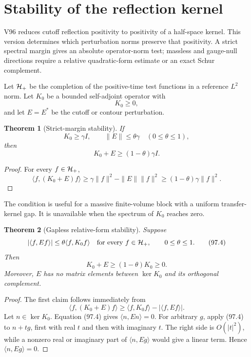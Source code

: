 \documentclass[11pt]{article}
\newtheorem{theorem}{Theorem}[section]
\begin{document}
\section{Stability of the reflection kernel}
\label{sec:v11v97}

V96 reduces cutoff reflection positivity to positivity of a
half-space kernel.  This version determines which perturbation norms
preserve that positivity.  A strict spectral margin gives an absolute
operator-norm test; massless and gauge-null directions require a
relative quadratic-form estimate or an exact Schur complement.

Let \({\cal H}_+\) be the completion of the positive-time test
functions in a reference \(L^2\) norm.  Let \(K_0\) be a bounded
self-adjoint operator with
\[
                              K_0\ge0,                       \tag{97.1}
\]
and let \(E=E^*\) be the cutoff or contour perturbation.

\begin{theorem}[Strict-margin stability]
\label{thm:v11v97-gap}
If
\[
                              K_0\ge\gamma I,\qquad
                              \|E\|\le\theta\gamma
                         \quad(0\le\theta\le1),              \tag{97.2}
\]
then
\[
                              K_0+E\ge(1-\theta)\gamma I.     \tag{97.3}
\]
\end{theorem}

\begin{proof}
For every \(f\in{\cal H}_+\),
\[
 \langle f,(K_0+E)f\rangle
 \ge\gamma\|f\|^2-\|E\|\|f\|^2
 \ge(1-\theta)\gamma\|f\|^2.
\]
\end{proof}

The condition is useful for a massive finite-volume block with a
uniform transfer-kernel gap.  It is unavailable when the spectrum of
\(K_0\) reaches zero.

\begin{theorem}[Gapless relative-form stability]
\label{thm:v11v97-relative}
Suppose
\[
 |\langle f,Ef\rangle|
       \le\theta\langle f,K_0f\rangle
                  \quad\text{for every }f\in{\cal H}_+,
                  \qquad 0\le\theta\le1.                    \tag{97.4}
\]
Then
\[
                              K_0+E\ge(1-\theta)K_0\ge0.      \tag{97.5}
\]
Moreover, \(E\) has no matrix elements between
\(\ker K_0\) and its orthogonal complement.
\end{theorem}

\begin{proof}
The first claim follows immediately from
\[
 \langle f,(K_0+E)f\rangle
 \ge\langle f,K_0f\rangle-|\langle f,Ef\rangle|.
\]
Let \(n\in\ker K_0\).  Equation (97.4) gives
\(\langle n,En\rangle=0\).  For arbitrary \(g\), apply (97.4) to
\(n+tg\), first with real \(t\) and then with imaginary \(t\).
The right side is \(O(|t|^2)\), while a nonzero real or imaginary part
of \(\langle n,Eg\rangle\) would give a linear term.  Hence
\(\langle n,Eg\rangle=0\).
\end{proof}
\end{document}
